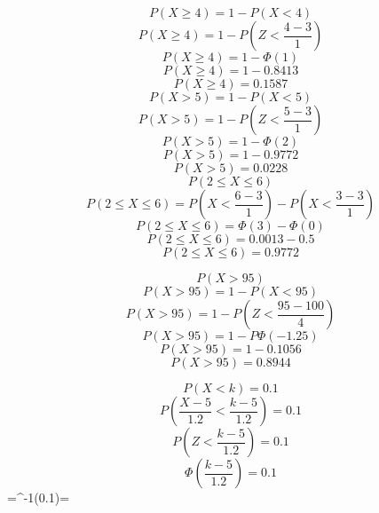 $$P(X\geq4)=1-P(X<4)$$
$$P(X\geq4)=1-P(Z<\frac{4-3}{1})$$
$$P(X\geq4)=1-\Phi(1)$$
$$P(X\geq4)=1-0.8413$$
$$P(X\geq4)=0.1587$$
$$P(X>5)=1-P(X<5)$$
$$P(X>5)=1-P(Z<\frac{5-3}{1})$$
$$P(X>5)=1-\Phi(2)$$
$$P(X>5)=1-0.9772$$
$$P(X>5)=0.0228$$
$$P(2\leq X \leq6)$$
$$P(2\leq X \leq6)=P(X<\frac{6-3}{1})-P(X<\frac{3-3}{1})$$
$$P(2\leq X \leq6)=\Phi(3)-\Phi(0)$$
$$P(2\leq X \leq6)=0.0013-0.5$$
$$P(2\leq X \leq6)=0.9772$$

$$P(X>95)$$
$$P(X>95)=1-P(X<95)$$
$$P(X>95)=1-P(Z<\frac{95-100}{4})$$
$$P(X>95)=1-P\Phi(-1.25)$$
$$P(X>95)=1-0.1056$$
$$P(X>95)=0.8944$$

$$P(X<k)=0.1$$
$$P(\frac{X-5}{1.2}<\frac{k-5}{1.2})=0.1$$
$$P(Z<\frac{k-5}{1.2})=0.1$$
$$\Phi(\frac{k-5}{1.2})=0.1$$
$$={\Phi}^{-1}(0.1)=